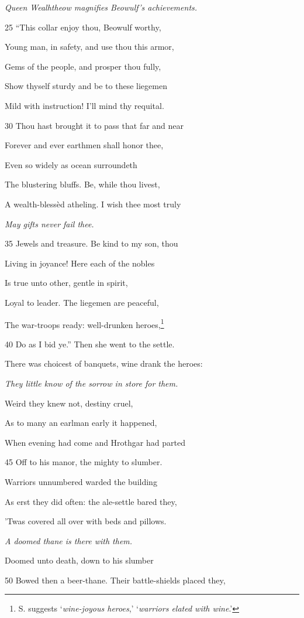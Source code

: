 \emph{Queen Wealhtheow
magnifies
Beowulf’s achievements.}

25
“This collar enjoy thou, Beowulf worthy,

Young man, in safety, and use thou this armor,

Gems of the people, and prosper thou fully,

Show thyself sturdy and be to these liegemen

Mild with instruction! I’ll mind thy requital.

30
Thou hast brought it to pass that far and near

Forever and ever earthmen shall honor thee,

Even so widely as ocean surroundeth

The blustering bluffs. Be, while thou livest,

A wealth-blessèd atheling. I wish thee most truly

\emph{May gifts never
fail thee.}

35
Jewels and treasure. Be kind to my son, thou

Living in joyance! Here each of the nobles

Is true unto other, gentle in spirit,

Loyal to leader. The liegemen are peaceful,

The war-troops ready: well-drunken heroes,\footnote{S. suggests ‘\emph{wine-joyous heroes},’ ‘\emph{warriors elated with wine}.’}

40
Do as I bid ye.” Then she went to the settle.

There was choicest of banquets, wine drank the heroes:

\emph{They little know
of the sorrow in
store for them.}

Weird they knew not, destiny cruel,

As to many an earlman early it happened,

When evening had come and Hrothgar had parted

45
Off to his manor, the mighty to slumber.

Warriors unnumbered warded the building

As erst they did often: the ale-settle bared they,

’Twas covered all over with beds and pillows.

\emph{A doomed thane is
there with them.}

Doomed unto death, down to his slumber

50
Bowed then a beer-thane. Their battle-shields placed they,

